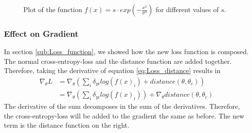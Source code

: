 \begin{figure}[h]\label{fig:Gaussian_strength}
    \centering
    \begin{center}
         \caption{Plot of the function $f(x)=s\cdot exp(-\frac{x^2}{\sigma^2})$ for different values of $s$.}
    \end{center}
\end{figure}

\subsubsection{Effect on Gradient}\label{sub:Effect_on_Gradient} 
In section \ref{sub:Loss_function}, we showed how the new loss function is
composed. The normal cross-entropy-loss and the distance function are added
together. Therefore, taking the derivative of equation \ref{eq:Loss_distance}
results in 
\begin{align}
    \nabla_\theta L 
    &= \nabla_\theta (\sum_{i} \delta_{yi} log(f(x)_i) + distance(\theta, \theta_c))\\
    &= \nabla_\theta (\sum_{i} \delta_{yi} log(f(x)_i)) + \nabla_\theta distance(\theta, \theta_c)
\end{align}
The derivative of the sum decomposes in the sum of the derivatives. Therefore,
the cross-entropy-loss will be added to the gradient the same as before. The new
term is the distance function on the right.

